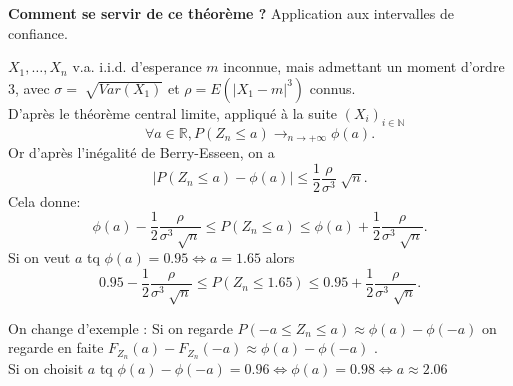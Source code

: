 \documentclass{article}
\theoremstyle{plain}%
\theoremstyle{definition}
\theoremstyle{remark}
\begin{document}
\textbf{Comment se servir de ce théorème ?} Application aux intervalles de confiance.

$ X_1, \dots, X_n $ v.a. i.i.d. d'esperance $ m $ inconnue, mais admettant un moment d'ordre 3, avec $ \sigma = \sqrt[]{Var(X_1)} $ et $ \rho =E(\left| X_1 - m \right| ^3) $ connus. \\
D'après le théorème central limite, appliqué à la suite $ (X_i)_{i \in \mathbb{N}} $ 
\[
    \forall a \in \mathbb{R}, P(Z_n \leq a) \to _{n \to +\infty } \phi (a)
.\]
Or d'après l'inégalité de Berry-Esseen, on a 
\[
    \left| P(Z_n \leq a) - \phi (a) \right| \leq \frac{1}{2}\frac{\rho }{\sigma ^3}\sqrt[]{n}
.\]
Cela donne: 
\[
    \phi (a) - \frac{1}{2}\frac{\rho }{\sigma ^3 \sqrt[]{n}}\leq P(Z_n \leq a) \leq \phi (a) + \frac{1}{2}\frac{\rho }{\sigma ^3 \sqrt[]{n}}
.\]
Si on veut $ a $ tq $ \phi (a) = 0.95 \Leftrightarrow a = 1.65 $ alors 
\[
    0.95 - \frac{1}{2}\frac{\rho }{\sigma ^3 \sqrt[]{n}} \leq P(Z_n \leq 1.65) \leq 0.95 + \frac{1}{2}\frac{\rho }{\sigma ^3 \sqrt[]{n}}
.\]




On change d'exemple  : Si on regarde $ P(-a \leq Z_n \leq a) \approx \phi (a) - \phi (-a) $ on regarde en faite $ F_{Z_n}(a) - F_{Z_n}(-a) \approx \phi (a) - \phi (-a) $ .\\
Si on choisit $ a $ tq $ \phi (a) - \phi (-a) = 0.96 \Leftrightarrow \phi (a) = 0.98 \Leftrightarrow a \approx 2.06$
\end{document}
